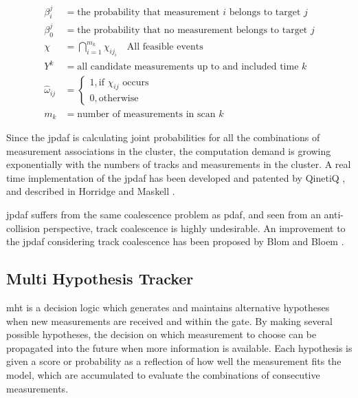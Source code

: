 \begin{equation*}
\begin{split}
	\beta_i^j			&= \text{the probability that measurement $i$ belongs to target $j$} \\
	\beta_0^j 			&= \text{the probability that no measurement belongs to target $j$} \\
	\chi 				&= \bigcap\limits_{i=1}^{m_k} \chi_{i j_i} \quad \text{All feasible events} \\
	Y^k 				&= \text{all candidate measurements up to and included time $k$} \\
	\hat{\omega}_{ij}	&=	\begin{cases}
								1, \text{if } \chi_{ij} \text{ occurs} \\ 
								0, \text{otherwise} 
							\end{cases} \\
	m_k					&= \text{number of measurements in scan $k$}
\end{split}
\end{equation*}

Since the \gls{jpdaf} is calculating joint probabilities for all the combinations of \gls{measurement} associations in the cluster, the computation demand is growing exponentially with the numbers of tracks and \glspl{measurement} in the cluster. A real time implementation of the \gls{jpdaf} has been developed and patented by QinetiQ \cite{QinetiQ2003}, and described in Horridge and Maskell \cite{Horridge}.

\gls{jpdaf} suffers from the same coalescence problem as \gls{pdaf}, and seen from an anti-collision perspective, track coalescence is highly undesirable. An improvement to the \gls{jpdaf} considering track coalescence has been proposed by Blom and Bloem \cite{Blom2000}. 

\subsection{Multi Hypothesis Tracker}
\label{sec:mht}
\gls{mht} is a decision logic which generates and maintains alternative hypotheses when new \glspl{measurement} are received and within the gate. By making several possible hypotheses, the decision on which \gls{measurement} to choose can be propagated into the future when more information is available. Each hypothesis is given a \gls{score} or probability as a reflection of how well the measurement fits the model, which are accumulated to evaluate the combinations of consecutive \glspl{measurement}.

